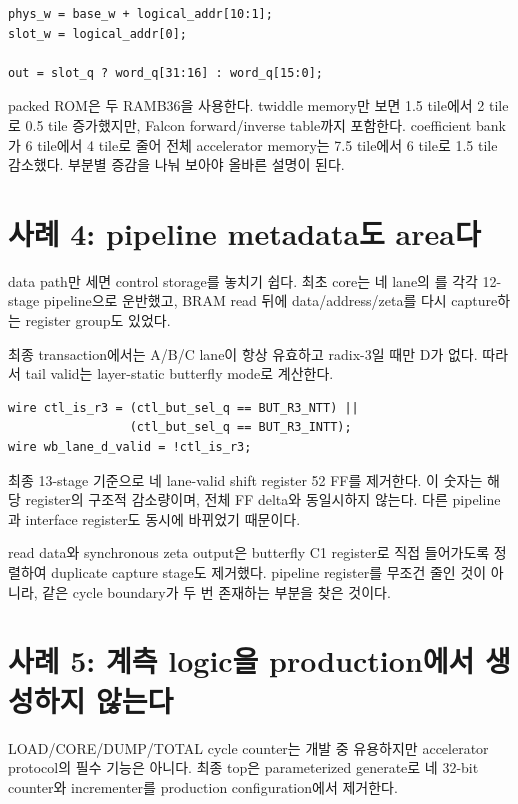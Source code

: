\begin{lstlisting}
phys_w = base_w + logical_addr[10:1];
slot_w = logical_addr[0];

out = slot_q ? word_q[31:16] : word_q[15:0];
\end{lstlisting}

packed ROM은 두 RAMB36을 사용한다. twiddle memory만 보면 1.5 tile에서 2 tile로
0.5 tile 증가했지만, Falcon forward/inverse table까지 포함한다. coefficient
bank가 6 tile에서 4 tile로 줄어 전체 accelerator memory는 7.5 tile에서 6
tile로 1.5 tile 감소했다. 부분별 증감을 나눠 보아야 올바른 설명이 된다.

\section{사례 4: pipeline metadata도 area다}

data path만 세면 control storage를 놓치기 쉽다. 최초 core는 네 lane의
를 각각 12-stage pipeline으로 운반했고, BRAM read 뒤에
data/address/zeta를 다시 capture하는 register group도 있었다.

최종 transaction에서는 A/B/C lane이 항상 유효하고 radix-3일 때만 D가 없다.
따라서 tail valid는 layer-static butterfly mode로 계산한다.

\begin{lstlisting}
wire ctl_is_r3 = (ctl_but_sel_q == BUT_R3_NTT) ||
                 (ctl_but_sel_q == BUT_R3_INTT);
wire wb_lane_d_valid = !ctl_is_r3;
\end{lstlisting}

최종 13-stage 기준으로 네 lane-valid shift register 52 FF를 제거한다. 이 숫자는
해당 register의 구조적 감소량이며, 전체 FF delta와 동일시하지 않는다. 다른
pipeline과 interface register도 동시에 바뀌었기 때문이다.

read data와 synchronous zeta output은 butterfly C1 register로 직접 들어가도록
정렬하여 duplicate capture stage도 제거했다. pipeline register를 무조건 줄인
것이 아니라, 같은 cycle boundary가 두 번 존재하는 부분을 찾은 것이다.

\section{사례 5: 계측 logic을 production에서 생성하지 않는다}

LOAD/CORE/DUMP/TOTAL cycle counter는 개발 중 유용하지만 accelerator protocol의
필수 기능은 아니다. 최종 top은 parameterized generate로 네 32-bit counter와
incrementer를 production configuration에서 제거한다.

